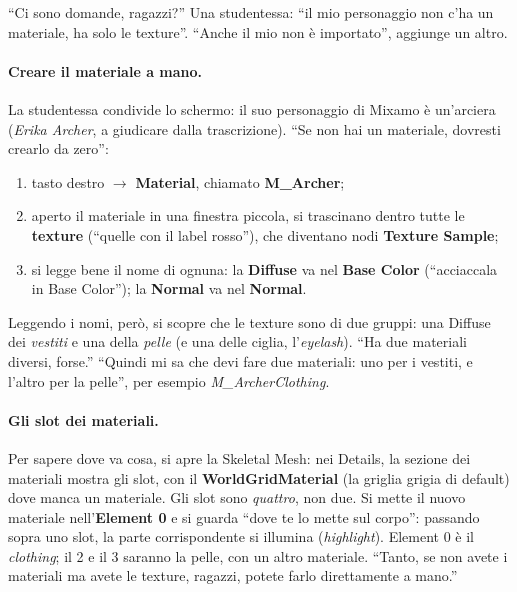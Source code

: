 ``Ci sono domande, ragazzi?'' Una studentessa: ``il mio personaggio non c'ha un
materiale, ha solo le texture''. ``Anche il mio non è importato'', aggiunge un altro.

\paragraph{Creare il materiale a mano.} La studentessa condivide lo schermo: il suo
personaggio di Mixamo è un'arciera (\emph{Erika Archer}, a giudicare dalla trascrizione).
``Se non hai un materiale, dovresti crearlo da zero'':
\begin{enumerate}
  \item tasto destro $\rightarrow$ \textbf{Material}, chiamato \textbf{M\_Archer};
  \item aperto il materiale in una finestra piccola, si trascinano dentro tutte le
        \textbf{texture} (``quelle con il label rosso''), che diventano nodi
        \textbf{Texture Sample};
  \item si legge bene il nome di ognuna: la \textbf{Diffuse} va nel \textbf{Base Color}
        (``acciaccala in Base Color''); la \textbf{Normal} va nel \textbf{Normal}.
\end{enumerate}
Leggendo i nomi, però, si scopre che le texture sono di due gruppi: una Diffuse dei
\emph{vestiti} e una della \emph{pelle} (e una delle ciglia, l'\emph{eyelash}). ``Ha due
materiali diversi, forse.'' ``Quindi mi sa che devi fare due materiali: uno per i
vestiti, e l'altro per la pelle'', per esempio \emph{M\_ArcherClothing}.

\paragraph{Gli slot dei materiali.} Per sapere dove va cosa, si apre la Skeletal Mesh:
nei Details, la sezione dei materiali mostra gli slot, con il \textbf{WorldGridMaterial}
(la griglia grigia di default) dove manca un materiale. Gli slot sono \emph{quattro}, non
due. Si mette il nuovo materiale nell'\textbf{Element 0} e si guarda ``dove te lo mette sul
corpo'': passando sopra uno slot, la parte corrispondente si illumina
(\emph{highlight}). Element 0 è il \emph{clothing}; il 2 e il 3 saranno la pelle, con un
altro materiale. ``Tanto, se non avete i materiali ma avete le texture, ragazzi, potete
farlo direttamente a mano.''

